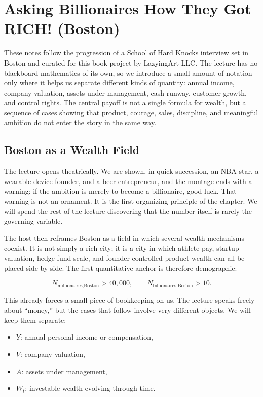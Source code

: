 \chapter{Asking Billionaires How They Got RICH! (Boston)}

These notes follow the progression of a School of Hard Knocks interview set in Boston and curated for this book project by LazyingArt LLC. The lecture has no blackboard mathematics of its own, so we introduce a small amount of notation only where it helps us separate different kinds of quantity: annual income, company valuation, assets under management, cash runway, customer growth, and control rights. The central payoff is not a single formula for wealth, but a sequence of cases showing that product, courage, sales, discipline, and meaningful ambition do not enter the story in the same way.

\section{Boston as a Wealth Field}

The lecture opens theatrically. We are shown, in quick succession, an NBA star, a wearable-device founder, and a beer entrepreneur, and the montage ends with a warning: if the ambition is merely to become a billionaire, good luck. That warning is not an ornament. It is the first organizing principle of the chapter. We will spend the rest of the lecture discovering that the number itself is rarely the governing variable.

The host then reframes Boston as a field in which several wealth mechanisms coexist. It is not simply a rich city; it is a city in which athlete pay, startup valuation, hedge-fund scale, and founder-controlled product wealth can all be placed side by side. The first quantitative anchor is therefore demographic:

\begin{equation}
N_{\text{millionaires,Boston}} > 40{,}000,
\qquad
N_{\text{billionaires,Boston}} > 10.
\end{equation}

This already forces a small piece of bookkeeping on us. The lecture speaks freely about ``money,'' but the cases that follow involve very different objects. We will keep them separate:
\begin{itemize}
\item \(Y\): annual personal income or compensation,
\item \(V\): company valuation,
\item \(A\): assets under management,
\item \(W_t\): investable wealth evolving through time.
\end{itemize}

